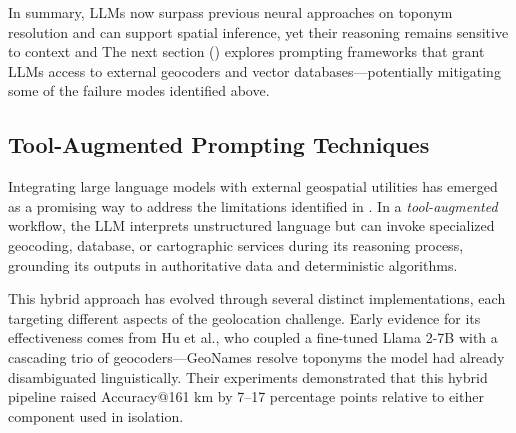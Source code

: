 In summary, \DIFdelbegin {}\DIFdelend \DIFaddbegin {}\DIFaddend LLMs now surpass previous neural approaches on
toponym resolution and can support \DIFdelbegin {}\DIFdelend \DIFaddbegin {}\DIFaddend spatial inference, yet
their reasoning remains sensitive to context and \DIFdelbegin {}\DIFdelend \DIFaddbegin {}\DIFaddend The
next section (\DIFdelbegin {}\DIFdelend \DIFaddbegin {}) explores \DIFdelbegin {}\DIFdelend \DIFaddbegin {}\DIFaddend prompting frameworks
that grant LLMs access to external geocoders and vector
databases---potentially mitigating some of the failure modes identified
above.

\subsection{Tool-Augmented Prompting
Techniques}\label{tool-augmented-prompting-techniques}

Integrating large language models with external geospatial utilities has
emerged as a promising way to address the limitations identified in
\DIFdelbegin {}\DIFdelend \DIFaddbegin {}. In a \emph{tool-augmented} workflow, the LLM interprets
unstructured language but can invoke specialized geocoding, database, or
cartographic services during its reasoning process, grounding its
outputs in authoritative data and deterministic algorithms.

This hybrid approach has evolved through several distinct
implementations, each targeting different aspects of the geolocation
challenge. Early evidence for its effectiveness comes from Hu et
al.\DIFaddbegin \DIFadd{~}\DIFaddend \citep{Hu2024_toponym_llm}, who coupled a fine-tuned Llama 2-7B with
a cascading trio of geocoders---GeoNames \DIFdelbegin {}\DIFdelend \DIFaddbegin {}\DIFaddend resolve toponyms the model had already
disambiguated linguistically. Their experiments demonstrated that this
hybrid pipeline raised Accuracy@161 km by 7--17 percentage points
relative to either component used in isolation.

